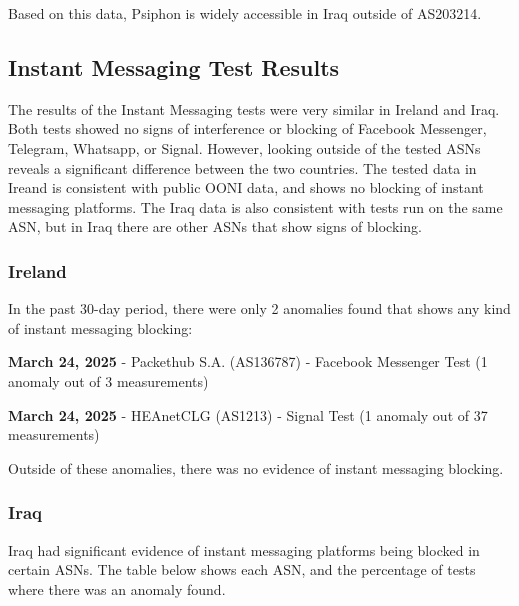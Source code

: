 Based on this data, Psiphon is widely accessible in Iraq outside of AS203214.

\subsection{Instant Messaging Test Results}

The results of the Instant Messaging tests were very similar in Ireland and Iraq. Both tests showed no signs of interference or blocking of Facebook Messenger, Telegram, Whatsapp, or Signal. However, looking outside of the tested ASNs reveals a significant difference between the two countries. The tested data in Ireand is consistent with public OONI data, and shows no blocking of instant messaging platforms. The Iraq data is also consistent with tests run on the same ASN, but in Iraq there are other ASNs that show signs of blocking.

\subsubsection{Ireland}

In the past 30-day period, there were only 2 anomalies found that shows any kind of instant messaging blocking:

\textbf{March 24, 2025} - Packethub S.A. (AS136787) - Facebook Messenger Test (1 anomaly out of 3 measurements)

\textbf{March 24, 2025} - HEAnetCLG (AS1213) - Signal Test (1 anomaly out of 37 measurements)

Outside of these anomalies, there was no evidence of instant messaging blocking.

\subsubsection{Iraq}

Iraq had significant evidence of instant messaging platforms being blocked in certain ASNs. The table below shows each ASN, and the percentage of tests where there was an anomaly found.

\vspace{2em}

